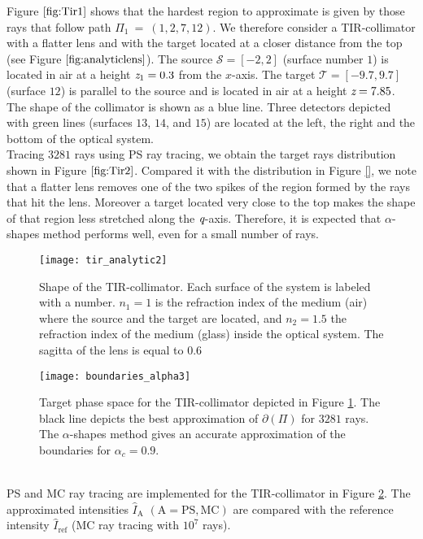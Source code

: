  Figure $\ref{fig:Tir1}$ shows that the hardest region to approximate is given by those rays that follow path $\Pi_1 ~=~ (1,2,7,12)$.
 We therefore consider a TIR-collimator with a flatter lens and with the target located at a closer distance from the top (see Figure $\ref{fig:analyticlens}$). 
The source $\mathcal{S}= [-2,2]$ (surface number $1$) is located in air at a height $\textit{z}_1 = 0.3$ from the $x$-axis.
       The target $\mathcal{T}= [-9.7, 9.7]$ (surface $12$) is parallel to the source and is located in air at a height $ \textit{z}= 7.85$.
       The shape of the collimator is shown as a blue line.
       Three detectors depicted with green lines (surfaces $13$, $14$, and $15$) are located at the left, the right and the bottom of the optical system.
 \\ \indent Tracing $3281$ rays using PS ray tracing, we obtain the target rays distribution shown in Figure $\ref{fig:Tir2}$. 
Compared it with the distribution in Figure \ref{}, we note that a flatter lens removes one of the two spikes of the region formed by the rays that hit the lens.
Moreover a target located very close to the top makes the shape of that region less stretched along the $\textit{q}$-axis.
Therefore, it is expected that $\alpha$-shapes method performs well, even for a small number of rays.
\begin{figure}[h]
  \begin{center}
  \texttt{[image: tir\_analytic2]}
   \end{center}
    \caption{Shape of the TIR-collimator. Each surface of the system is labeled with a number.
       $n_1 = 1$ is the refraction index of the medium (air) where the source and the target are located, and
       $n_2 = 1.5 $ the refraction index of the medium (glass) inside the optical system. The sagitta of the lens is equal to $0.6$}
 \label{fig:analyticlens}
\end{figure}
 \begin{figure}[h]
  \begin{center}
       \texttt{[image: boundaries\_alpha3]}
   \end{center}
        \caption{Target phase space for the TIR-collimator depicted in
        Figure \ref{fig:analyticlens}. The black line depicts the best approximation of $\partial$$(\Pi)$ for $3281$ rays. 
The $\alpha$-shapes method gives an accurate approximation of the boundaries for $\alpha_c = 0.9$.}
  \label{fig:Tir2}
\end{figure}
\\ \indent PS and MC ray tracing are implemented for the TIR-collimator in Figure \ref{fig:Tir2}. The approximated intensities $\hat{I}_{\textrm{A}}$ $(\textrm{A} = \textrm{PS}, \textrm{MC})$ are compared with the reference intensity $\hat{I}_{\textrm{ref}}$ (MC ray tracing with $10^7$ rays).
